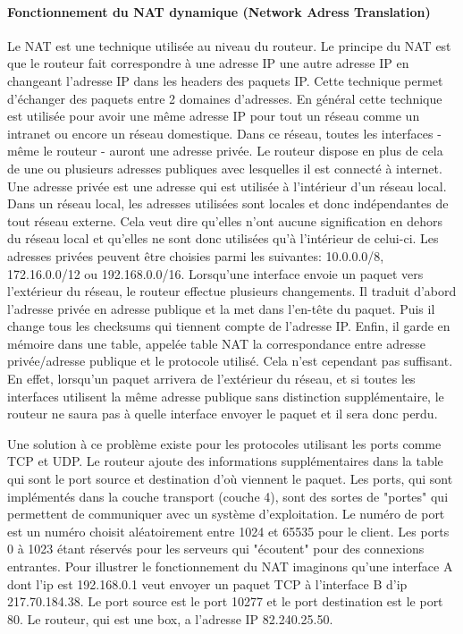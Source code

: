 \paragraph{Fonctionnement du NAT dynamique (Network Adress Translation)}
Le NAT est une technique utilisée au niveau du routeur. Le principe du NAT est
que le routeur fait correspondre à une adresse IP une autre adresse IP en
changeant l'adresse IP dans les headers des paquets IP. Cette technique permet
d'échanger des paquets entre 2 domaines d'adresses. En général cette technique
est utilisée pour avoir une même adresse IP pour tout un réseau comme un 
intranet ou encore un réseau domestique. Dans ce réseau, toutes les interfaces
- même le routeur - auront une adresse privée. Le routeur dispose en plus de
cela de une ou plusieurs adresses publiques avec lesquelles il est connecté à
internet. Une adresse privée est une adresse qui est utilisée à l'intérieur
d'un réseau local. Dans un réseau local, les adresses utilisées sont locales et donc
indépendantes de tout réseau externe. Cela veut dire qu'elles n'ont aucune
signification en dehors du réseau local et qu'elles ne sont donc utilisées qu'à
l'intérieur de celui-ci. Les adresses privées peuvent être choisies parmi les
suivantes: 10.0.0.0/8, 172.16.0.0/12 ou 192.168.0.0/16.
\smallbreak
Lorsqu'une interface envoie un paquet vers l'extérieur du réseau, le routeur
effectue plusieurs changements. Il traduit d'abord l'adresse privée en adresse
publique et la met dans l'en-tête du paquet. Puis il change tous les checksums
qui tiennent compte de l'adresse IP. Enfin, il garde en mémoire dans une table,
 appelée table NAT la correspondance entre adresse privée/adresse publique et le
protocole utilisé.
\newline
Cela n'est cependant pas suffisant. En effet, lorsqu'un paquet arrivera de
l'extérieur du réseau, et si toutes les interfaces utilisent la même adresse
publique sans distinction supplémentaire, le routeur ne saura pas à quelle
interface envoyer le paquet et il sera donc perdu.

Une solution à ce problème existe pour les protocoles utilisant les ports comme
TCP et UDP. Le routeur ajoute des informations supplémentaires dans la table qui
sont le port source et destination d'où viennent le paquet. Les ports, qui sont implémentés dans
la couche transport (couche 4), sont des sortes de "portes" qui permettent de
communiquer avec un système d'exploitation. Le numéro de port est un numéro
choisit aléatoirement entre 1024 et 65535 pour le client. Les ports 0 à 1023 étant réservés
pour les serveurs qui "écoutent" pour des connexions entrantes.
\newline
Pour illustrer le fonctionnement du NAT imaginons qu'une interface A dont l'ip
est 192.168.0.1 veut envoyer un paquet TCP à l'interface B d'ip 217.70.184.38.
Le port source est le port 10277 et le port destination est le port 80. Le
routeur, qui est une box, a l'adresse IP  82.240.25.50.


